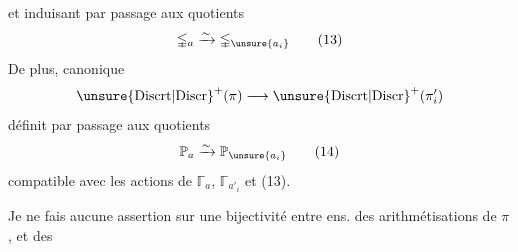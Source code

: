 
et induisant par passage aux quotients
\[
\mathbb{\Gamma}_a\xrightarrow{\sim}
\mathbb{\Gamma}_{\unsure{a_i}}
\tag{13}
\]
De plus, \uline{} canonique
\[
\unsure{\mathrm{Discrt}|\mathrm{Discr}}^{+}(\pi)\longrightarrow
\unsure{\mathrm{Discrt}|\mathrm{Discr}}^{+}(\pi'_i)
\]
définit par passage aux quotients
\[
\mathbb{P}_a\xrightarrow{\sim}\mathbb{P}_{\unsure{a_i}}
\tag{14}
\]
compatible avec les actions de $\mathbb{\Gamma}_a$,
$\mathbb{\Gamma}_{a'_i}$ et (13).

Je ne fais  aucune assertion sur
une  bijectivité entre
ens. des arithmétisations de $\pi$, et  des
